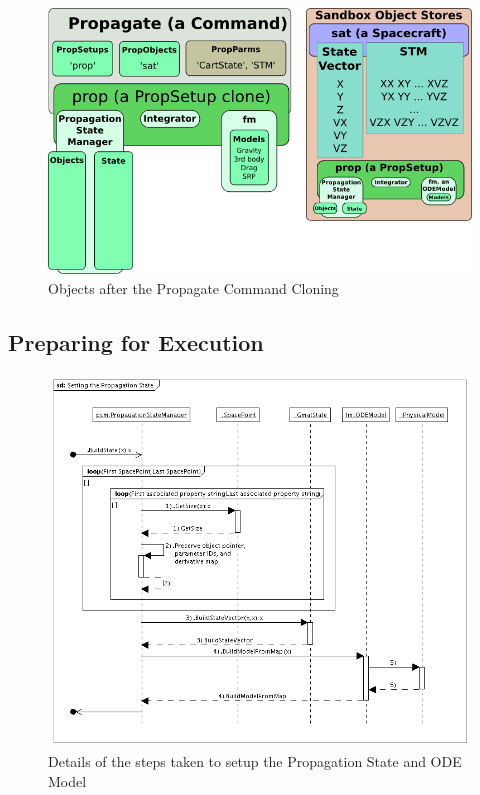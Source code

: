\documentclass[10pt]{article}
\begin{document}
\begin{figure}[htb] 
   \centering
   \includegraphics[372,233]{Images/PersistenceCloned.png} 
   \caption{Objects after the Propagate Command Cloning}
   \label{fig:PersistenceCloned}
\end{figure}

\subsection{Preparing for Execution}

\begin{figure}[htb] 
   \centering
   \includegraphics[380,335]{Images/SettingthePropagationState.png} 
   \caption{Details of the steps taken to setup the Propagation State and ODE Model}
   \label{fig:P2PSetPropSate}
\end{figure}
\end{document}
